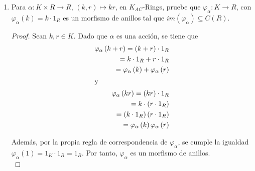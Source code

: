 \documentclass{article}
\newcommand{\lrprth}[1]{
    \left(#1\right)
}
\newcommand{\ringcenter}[1]{
    C\lrprth{#1}
}
\theoremstyle{definition}
\theoremstyle{plain}
\theoremstyle{plain}
\theoremstyle{definition}
\theoremstyle{definition}
\theoremstyle{definition}
\theoremstyle{definition}
\theoremstyle{definition}
\theoremstyle{definition}
\begin{document}
\begin{enumerate}[label=\textbf{Ej \arabic*.}]
\begin{proof}
\begin{align*}
        &=\lrprth{k\bullet\varphi r_1}r_2.\\
        &=r_1\lrprth{\varphi(k)r_2}\\
        &=r_1\lrprth{k\bullet_\varphi r_2}.
    \end{align*}
    $\boxed{\text{(AC5)}}$ Sean $r\in R$. Así
    \begin{align*}
        1_K\bullet_\varphi r&=\varphi(1_K)r\\
        &=1_R\cdot r && ,\ \varphi\text{ es un morfismo de anillos.}\\
        \therefore & \ \lrprth{R,\bullet_\varphi}\in K_{Ac}-Rings.
    \end{align*}
    \end{proof}
    
    \item 
    Para $\alpha : K \times R \longrightarrow R$, $\lrprth{k,r} \mapsto kr$, en $K_{AC}$-Rings, pruebe que $\varphi_{\alpha} : K \longrightarrow R$, con $\varphi_{\alpha}\lrprth{k}=k \cdot 1_{R}$ es un morfismo de anillos tal que $im\lrprth{\varphi_{\alpha}}\subseteq \ringcenter{R}$.
\begin{proof}
Sean $k,r \in K$. Dado que $\alpha$ es una acción, se tiene que
\begin{align*}
\varphi_{\alpha}\lrprth{k+r}=\lrprth{k+r}\cdot 1_{R}\\
=k \cdot 1_{R} + r \cdot 1_{R}\\
=\varphi_{\alpha}\lrprth{k}+\varphi_{\alpha}\lrprth{r}\\
\intertext{y}
\varphi_{\alpha}\lrprth{kr}=\lrprth{kr}\cdot 1_{R}\\
=k \cdot\lrprth{r \cdot 1_{R}}\\
=\lrprth{k \cdot 1_{R}}\lrprth{r \cdot 1_{R}}\\
=\varphi_{\alpha}\lrprth{k}\varphi_{\alpha}\lrprth{r}
\end{align*}

Además, por la propia regla de correspondencia de $\varphi_{\alpha}$, se cumple la igualdad $\varphi_{\alpha}\lrprth{1}=1_{K} \cdot 1_{R} = 1_{R}$. Por tanto, $\varphi_{\alpha}$ es un morfismo de anillos.\\


\end{proof}
\end{enumerate}
\end{document}
